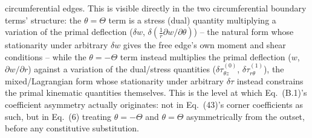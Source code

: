 \documentclass[11pt]{article}
\begin{document}
circumferential edges. This is visible directly in the two circumferential
boundary terms' structure: the $\theta=\Theta$ term is a stress (dual)
quantity multiplying a variation of the primal deflection ($\delta w$,
$\delta(\tfrac1r\partial w/\partial\theta)$) -- the natural form whose
stationarity under arbitrary $\delta w$ gives the free edge's own moment
and shear conditions -- while the $\theta=-\Theta$ term instead multiplies
the primal deflection ($w$, $\partial w/\partial r$) against a variation of
the dual/stress quantities ($\delta\tau^{(0)}_{\theta z}$,
$\delta\tau^{(1)}_{r\theta}$), the mixed/Lagrangian form whose
stationarity under arbitrary $\delta\tau$ instead constrains the primal
kinematic quantities themselves. This is the level at which Eq.~(B.1)'s
coefficient asymmetry actually originates: not in Eq.~(43)'s corner
coefficients as such, but in Eq.~(6) treating $\theta=-\Theta$ and
$\theta=\Theta$ asymmetrically from the outset, before any constitutive
substitution.
\end{document}
